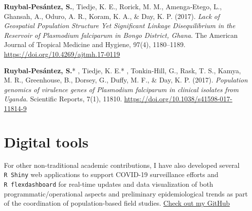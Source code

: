 \documentclass[11pt,a4paper,]{awesome-cv}
\begin{document}
\textbf{Ruybal‐Pesántez, S.}, Tiedje, K. E., Rorick, M. M.,
Amenga‐Etego, L., Ghansah, A., Oduro, A. R., Koram, K. A., \& Day, K. P.
(2017). \emph{Lack of Geospatial Population Structure Yet Significant
Linkage Disequilibrium in the Reservoir of Plasmodium falciparum in
Bongo District, Ghana}. The American Journal of Tropical Medicine and
Hygiene, 97(4), 1180--1189. \url{https://doi.org/10.4269/ajtmh.17-0119}

\textbf{Ruybal‐Pesántez, S.}* , Tiedje, K. E.* , Tonkin‐Hill, G., Rask,
T. S., Kamya, M. R., Greenhouse, B., Dorsey, G., Duffy, M. F., \& Day,
K. P. (2017). \emph{Population genomics of virulence genes of Plasmodium
falciparum in clinical isolates from Uganda}. Scientific Reports, 7(1),
11810. \url{https://doi.org/10.1038/s41598-017-11814-9}

\setlength{\leftskip}{0cm}

\newpage

\hypertarget{digital-tools}{%
\section{Digital tools}\label{digital-tools}}

\footnotesize

For other non-traditional academic contributions, I have also developed
several \texttt{R\ Shiny} web applications to support COVID-19
surveillance efforts and \texttt{R\ flexdashboard} for real-time updates
and data visualization of both programmatic/operational aspects and
preliminary epidemiological trends as part of the coordination of
population-based field studies.
\href{https://github.com/shaziaruybal}{Check out my GitHub
\faExternalLink}
\end{document}

